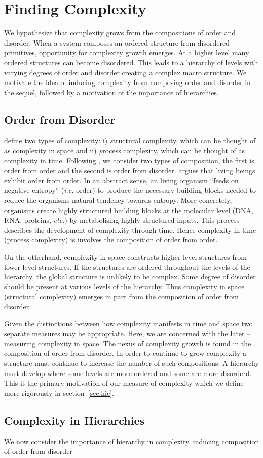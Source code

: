 \section{Finding Complexity}

We hypothesize that complexity grows from the compositions of order and
disorder.  When a system composes an ordered structure from disordered
primitives, opportunity for complexity growth emerges. At a higher level many
ordered structures can become disordered. This leads to a hierarchy of levels
with varying degrees of order and disorder creating a complex macro structure.
We motivate the idea of inducing complexity from composing order and disorder
in the sequel, followed by a motivation of the importance of hierarchies. 

\subsection{Order from Disorder}

\citet{adami2002complexity} define two types of complexity: i) {\emph
structural complexity}, which can be thought of as complexity in space and ii)
{\emph process complexity}, which can be thought of as complexity in time.
Following \citet{schrodinger1944}, we consider two types of composition, the
first is order from order and the second is order from disorder.  \citet[chap.
6]{schrodinger1944} argues that living beings exhibit order from order. In an
abstract sense, an living organism ``feeds on negative entropy'' (\emph{i.e.}
order) to produce the necessary building blocks needed to reduce the organisms
natural tendency towards entropy. More concretely, organisms create highly
structured building blocks at the molecular level (DNA, RNA, proteins,
\emph{etc.}) by metabolising highly structured inputs. This process describes
the development of complexity through time. Hence complexity in time (process
complexity) is involves the composition of order from order. 

On the otherhand, complexity in space constructs higher-level structures from
lower level structures. If the structures are ordered throughout the levels of
the hierarchy, the global structure is unlikely to be complex. Some degree of
disorder should be present at various levels of the hierarchy. Thus complexity
in space (structural complexity) emerges in part from the composition of order
from disorder.

Given the distinctions between how complexity manifests in time and space two
separate measures may be appropriate. Here, we are concerned with the later --
measuring complexity in space. The nexus of complexity growth is found in the
composition of order from disorder. In order to continue to grow complexity a
structure must continue to increase the number of such compositions. A
hierarchy must develop where some levels are more ordered and some are more
disorderd. This it the primary motivation of our measure of complexity which we
define more rigorously in section~\ref{sec:hic}.

\subsection{Complexity in Hierarchies}

We now consider the importance of hierarchy in complexity. inducing composition
of order from disorder
